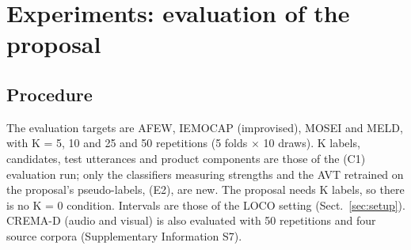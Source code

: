 \FloatBarrier
\section{Experiments: evaluation of the proposal}\label{sec:experiments}

\subsection{Procedure}\label{sec:procedure}
The evaluation targets are AFEW, IEMOCAP (improvised), MOSEI and MELD, with K = 5, 10 and 25 and 50 repetitions (5 folds $\times$ 10 draws). K labels, candidates, test utterances and product components are those of the (C1) evaluation run; only the classifiers measuring strengths and the AVT retrained on the proposal's pseudo-labels, (E2), are new. The proposal needs K labels, so there is no K = 0 condition. Intervals are those of the LOCO setting (Sect.~\ref{sec:setup}). CREMA-D (audio and visual) is also evaluated with 50 repetitions and four source corpora (Supplementary Information S7).

